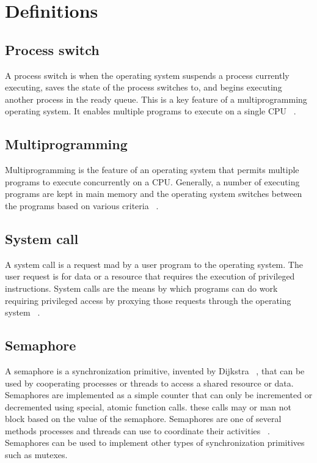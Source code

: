 \documentclass[12pt]{article}
\date{\today}
\begin{document}
\maketitle

\section*{Definitions}
\subsection*{Process switch}
A process switch is when the operating system suspends a process
currently executing, saves the state of the process switches to, and
begins executing another process in the ready queue.  This is a key
feature of a multiprogramming operating system.  It enables multiple
programs to execute on a single CPU ~\cite{stallings}.

\subsection*{Multiprogramming}
Multiprogramming is the feature of an operating system that permits
multiple programs to execute concurrently on a CPU. Generally, a
number of executing programs are kept in main memory and the
operating system switches between the programs based on various
criteria ~\cite{stallings}.

\subsection*{System call}
A system call is a request mad by a user program to the operating
system.  The user request is for data or a resource that requires the
execution of privileged instructions.  System calls are the means by
which programs can do work requiring privileged access by proxying
those requests through the operating system ~\cite{stallings}.

\subsection*{Semaphore}
A semaphore is a synchronization primitive, invented by Dijkstra
~\cite{wikipedia-semaphore}, that can be used by cooperating processes
or threads to access a shared resource or data.  Semaphores are
implemented as a simple counter that can only be incremented or
decremented using special, atomic function calls.  these calls may or
man not block based on the value of the semaphore.  Semaphores are one
of several methods processes and threads can use to coordinate their
activities ~\cite{stallings}.  Semaphores can be used to implement
other types of synchronization primitives such as mutexes.
\end{document}

